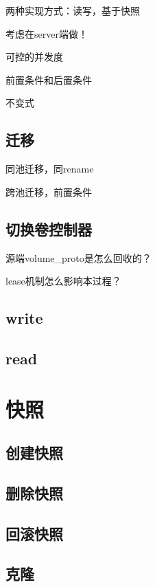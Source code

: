 两种实现方式：读写，基于快照

考虑在server端做！

可控的并发度

前置条件和后置条件

不变式

\subsection{迁移}

同池迁移，同rename

跨池迁移，前置条件

\subsection{切换卷控制器}

\begin{compactenum}
\item 源端volume\_proto是怎么回收的？
\item lease机制怎么影响本过程？
\end{compactenum}

\subsection{write}

\subsection{read}

\section{快照}

\subsection{创建快照}

\subsection{删除快照}

\subsection{回滚快照}

\subsection{克隆}

